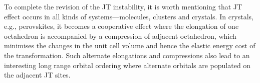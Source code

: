 \documentclass[a4paper,prb,twocolumn]{revtex4-1}  %
\newcommand{\com}[1]{}
\newcommand{\az}[1]{{\color{magenta}{#1}}} %
\begin{document}
 
To complete the revision of the JT instability,
it is worth mentioning that
JT effect occurs in all kinds of systems---molecules, clusters and crystals.
In crystals, e.g., perovskites, it becomes a cooperative effect where the
elongation of one octahedron is accompanied by a compression of adjacent octahedron,
which minimises the changes in the unit cell volume and hence the elastic energy cost of the transformation.
Such alternate elongations and compressions also lead to 
an interesting long range orbital ordering where alternate orbitals
are populated on the adjacent JT sites.
 
 
 
 



\com{
\begin{align}
E_{xy} =&
\frac{32}{7} \left[
\left(1-\frac{1}{(\delta +1)^3}\right) D_2
-
\left(1-\frac{1}{(\delta +1)^5}\right) \frac{20}{9}D_4
\right]\frac{q_o}{a},\\
E_{yz} =& E_{zx} = -3/2 E_{xy},
\end{align}
as measured from their average 
$E_0^{t_{2g}} = -64q_oD_4 \left(2+(\delta +1)^{-5}\right)/9a$.
Similarly, $e_g$ splits up as
\begin{align}
E_{x^2-y^2}=&\frac{32}{7} \left[\left(1-\frac{1}{(\delta +1)^3}\right) \text{D2}+\frac{5}{3}\left(1-\frac{1}{(\delta +1)^5}\right) \text{D4}\right]\frac{q_o}{a},\\
E_{z^2}=&-E_{x^2-y^2},
\end{align}
measured from their average 
$E_0^{e_{g}} = 32 q_oD_4 \left(2+(\delta +1)^{-5}\right)/3a$.
The crystal field splitting becomes
\begin{align}
\Delta \equiv E_0^{e_{g}}-E_0^{t_{2g}}=\frac{160}{9} \left(\frac{1}{(\delta +1)^5}+2\right) D_4.
\end{align}
}
\end{document}
